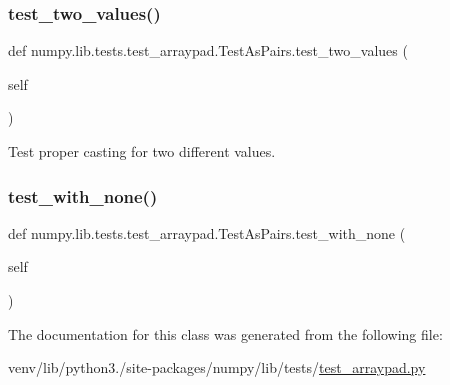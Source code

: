 \subsubsection{\texorpdfstring{test\+\_\+two\+\_\+values()}{test\_two\_values()}}
{\footnotesize\ttfamily def numpy.\+lib.\+tests.\+test\+\_\+arraypad.\+Test\+As\+Pairs.\+test\+\_\+two\+\_\+values (\begin{DoxyParamCaption}\item[{}]{self }\end{DoxyParamCaption})}

\begin{DoxyVerb}Test proper casting for two different values.\end{DoxyVerb}
 \mbox{\label{classnumpy_1_1lib_1_1tests_1_1test__arraypad_1_1TestAsPairs_aeb18b139b0a4731c251b34729fcf5e19}} 
\subsubsection{\texorpdfstring{test\+\_\+with\+\_\+none()}{test\_with\_none()}}
{\footnotesize\ttfamily def numpy.\+lib.\+tests.\+test\+\_\+arraypad.\+Test\+As\+Pairs.\+test\+\_\+with\+\_\+none (\begin{DoxyParamCaption}\item[{}]{self }\end{DoxyParamCaption})}



The documentation for this class was generated from the following file\+:\begin{DoxyCompactItemize}
\item 
venv/lib/python3./site-\/packages/numpy/lib/tests/\hyperlink{test__arraypad_8py}{test\+\_\+arraypad.\+py}\end{DoxyCompactItemize}
